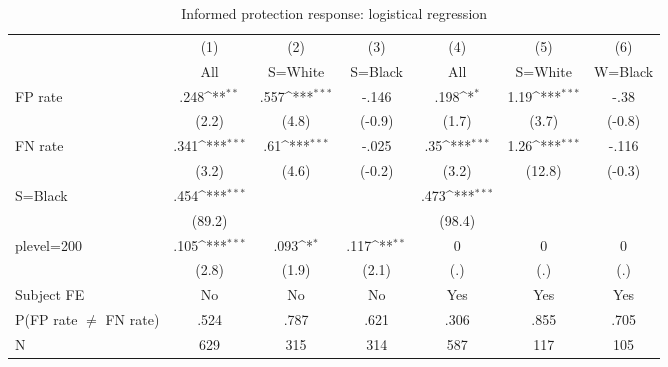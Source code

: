 \begin{table}[htbp]\centering
\def\sym#1{\ifmmode^{#1}\else\(^{#1}\)\fi}
\caption{Informed protection response: logistical regression}
\begin{tabular}{l*{6}{c}}
\hline\hline
                &\multicolumn{1}{c}{(1)}&\multicolumn{1}{c}{(2)}&\multicolumn{1}{c}{(3)}&\multicolumn{1}{c}{(4)}&\multicolumn{1}{c}{(5)}&\multicolumn{1}{c}{(6)}\\
                &\multicolumn{1}{c}{All}&\multicolumn{1}{c}{S=White}&\multicolumn{1}{c}{S=Black}&\multicolumn{1}{c}{All}&\multicolumn{1}{c}{S=White}&\multicolumn{1}{c}{W=Black}\\
\hline
FP rate         &     .248\sym{**} &     .557\sym{***}&    -.146         &     .198\sym{*}  &     1.19\sym{***}&     -.38         \\
                &    (2.2)         &    (4.8)         &   (-0.9)         &    (1.7)         &    (3.7)         &   (-0.8)         \\
FN rate         &     .341\sym{***}&      .61\sym{***}&    -.025         &      .35\sym{***}&     1.26\sym{***}&    -.116         \\
                &    (3.2)         &    (4.6)         &   (-0.2)         &    (3.2)         &   (12.8)         &   (-0.3)         \\
S=Black         &     .454\sym{***}&                  &                  &     .473\sym{***}&                  &                  \\
                &   (89.2)         &                  &                  &   (98.4)         &                  &                  \\
plevel=200      &     .105\sym{***}&     .093\sym{*}  &     .117\sym{**} &        0         &        0         &        0         \\
                &    (2.8)         &    (1.9)         &    (2.1)         &      (.)         &      (.)         &      (.)         \\
Subject FE      &       No         &       No         &       No         &      Yes         &      Yes         &      Yes         \\
\hline
P(FP rate $\neq$ FN rate)&     .524         &     .787         &     .621         &     .306         &     .855         &     .705         \\
N               &      629         &      315         &      314         &      587         &      117         &      105         \\

\end{tabular}
\end{table}
